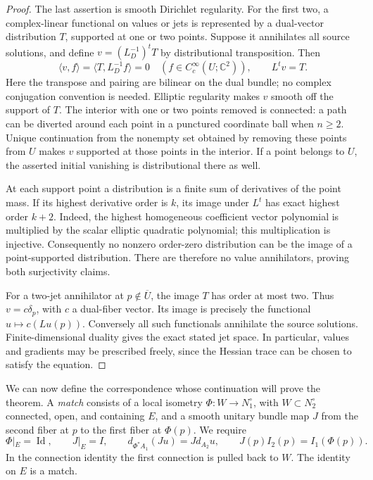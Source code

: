 \begin{proof}
The last assertion is smooth Dirichlet regularity.  For the first
two, a complex-linear functional on values or jets is represented
by a dual-vector distribution \(T\), supported at one or two points.
Suppose it annihilates all source solutions, and define
\(v=(L_D^{-1})^tT\) by distributional transposition.  Then
\[
 \langle v,f\rangle=\langle T,L_D^{-1}f\rangle=0
                    \quad(f\in C_c^\infty(U;\mathbb C^2)),
 \qquad L^tv=T.
\]
Here the transpose and pairing are bilinear on the dual bundle;
no complex conjugation convention is needed.  Elliptic regularity
makes \(v\) smooth off the support of \(T\).  The interior with
one or two points removed is connected: a path can be diverted
around each point in a punctured coordinate ball when \(n\ge2\).
Unique continuation from the nonempty set obtained by removing
these points from \(U\) makes \(v\) supported at those points in
the interior.  If a point belongs to \(U\), the asserted initial
vanishing is distributional there as well.

At each support point a distribution is a finite sum of derivatives
of the point mass.  If its highest derivative order is \(k\), its
image under \(L^t\) has exact highest order \(k+2\).  Indeed, the
highest homogeneous coefficient vector polynomial is multiplied
by the scalar elliptic quadratic polynomial; this multiplication
is injective.  Consequently no nonzero order-zero distribution
can be the image of a point-supported distribution.  There are
therefore no value annihilators, proving both surjectivity claims.

For a two-jet annihilator at \(p\notin\overline U\), the image
\(T\) has order at most two.  Thus \(v=c\delta_p\), with \(c\)
a dual-fiber vector.  Its image is precisely the functional
\(u\mapsto c(Lu(p))\).  Conversely all such functionals
annihilate the source solutions.  Finite-dimensional duality gives
the exact stated jet space.  In particular, values and gradients
may be prescribed freely, since the Hessian trace can be chosen
to satisfy the equation.
\end{proof}

We can now define the correspondence whose continuation will prove
the theorem.  A \emph{match} consists of a local isometry
\(\Phi:W\to N_1^\circ\), with \(W\subset N_2^\circ\) connected,
open, and containing \(E\), and a smooth unitary bundle map \(J\)
from the second fiber at \(p\) to the first fiber at \(\Phi(p)\).
We require
\begin{equation}\label{bdy:matching}
 \Phi|_E=\operatorname{Id},\qquad J|_E=I,\qquad
 d_{\Phi^*A_1}(Ju)=Jd_{A_2}u,\qquad
 J(p)I_2(p)=I_1(\Phi(p)).
\end{equation}
In the connection identity the first connection is pulled back to
\(W\).  The identity on \(E\) is a match.

